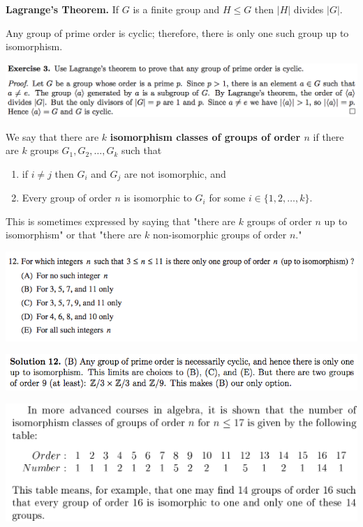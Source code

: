 \documentclass{article}
\begin{document}
\textbf{Lagrange's Theorem.} If \(G\) is a finite group and \(H \leq G\) then \(|H|\) divides \(|G|\).

Any group of prime order is cyclic; therefore, there is only one such group up to isomorphism.

\includegraphics[scale=0.45]{prime_order}

We say that there are \(k\) \textbf{isomorphism classes of groups of order \(n\)} if there are \(k\) groups \(G_1, G_2, \ldots, G_k\) such that

\begin{enumerate}[1.]

\item if \(i \neq j\) then \(G_i\) and \(G_j\) are not isomorphic, and

\item Every group of order \(n\) is isomorphic to \(G_i\) for some \(i \in \{1, 2, \ldots, k\}\).

\end{enumerate}

This is sometimes expressed by saying that "there are \(k\) groups of order \(n\) up to isomorphism" or that "there are \(k\) non-isomorphic groups of order \(n\)."

\includegraphics[scale=0.65]{1268_12}

\includegraphics[scale=0.65]{1268_12s}

\includegraphics[scale=0.45]{isomorphism_groups_order}
\end{document}
